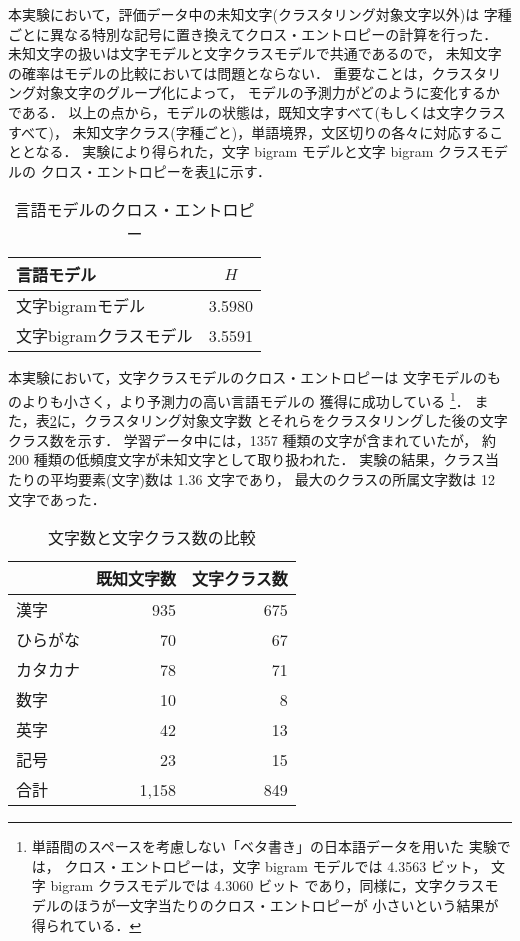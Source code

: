 本実験において，評価データ中の未知文字(クラスタリング対象文字以外)は
字種ごとに異なる特別な記号に置き換えてクロス・エントロピーの計算を行った．
未知文字の扱いは文字モデルと文字クラスモデルで共通であるので，
未知文字の確率はモデルの比較においては問題とならない．
重要なことは，クラスタリング対象文字のグループ化によって，
モデルの予測力がどのように変化するかである．
以上の点から，モデルの状態は，既知文字すべて(もしくは文字クラスすべて)，
未知文字クラス(字種ごと)，単語境界，文区切りの各々に対応することとなる．
実験により得られた，文字 bigram モデルと文字 bigram クラスモデルの
クロス・エントロピーを表\ref{Tab:CrossEntropy}に示す．
\begin{table}[hbt]
\begin{center}
\caption{言語モデルのクロス・エントロピー}
\label{Tab:CrossEntropy}
\begin{tabular}{l|r}
\hline
\hline
言語モデル & \multicolumn{1}{c}{$H$}\\
\hline
文字bigramモデル & 3.5980\\
文字bigramクラスモデル & 3.5591\\
\hline
\end{tabular}
\end{center}
\end{table}

本実験において，文字クラスモデルのクロス・エントロピーは
文字モデルのものよりも小さく，より予測力の高い言語モデルの
獲得に成功している
\footnote{
単語間のスペースを考慮しない「ベタ書き」の日本語データを用いた
実験では，
クロス・エントロピーは，文字 bigram モデルでは 4.3563 ビット，
文字 bigram クラスモデルでは 4.3060 ビット
であり，同様に，文字クラスモデルのほうが一文字当たりのクロス・エントロピーが
小さいという結果が得られている．
}．
また，表\ref{Tab:CharClassParameters}に，クラスタリング対象文字数
とそれらをクラスタリングした後の文字クラス数を示す．
学習データ中には，1357 種類の文字が含まれていたが，
約 200 種類の低頻度文字が未知文字として取り扱われた．
実験の結果，クラス当たりの平均要素(文字)数は 1.36 文字であり，
最大のクラスの所属文字数は 12 文字であった．
\begin{table}[hbt]
\begin{center}
\caption{文字数と文字クラス数の比較}
\label{Tab:CharClassParameters}
\begin{tabular}{l||r|r}
\hline
\hline
 & \multicolumn{1}{|c|}{既知文字数} & \multicolumn{1}{c}{文字クラス数}\\
\hline
漢字 & 935 & 675\\
ひらがな & 70 & 67\\
カタカナ & 78 & 71\\
数字 & 10 & 8\\
英字 & 42 & 13\\
記号 & 23 & 15\\
\hline
合計 & 1,158 & 849\\
\hline
\end{tabular}
\end{center}
\end{table}

